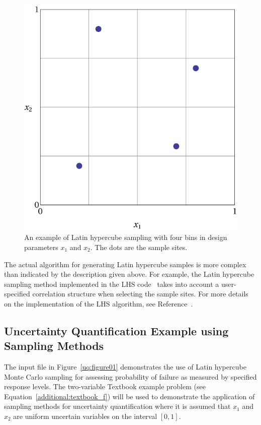 \begin{figure}[htbp!]
  \centering
  \includegraphics[scale=0.35]{images/lhs_graphic}
  \caption{An example of Latin hypercube sampling with four bins in
    design parameters $x_1$ and $x_2$. The dots
    are the sample sites.}
  \label{dace:figure01}
\end{figure}

The actual algorithm for generating Latin hypercube samples is more
complex than indicated by the description given above. For example,
the Latin hypercube sampling method implemented in the LHS
code~\cite{Swi04} takes into account a user-specified correlation
structure when selecting the sample sites. For more details on the
implementation of the LHS algorithm, see Reference~\cite{Swi04}.

\subsection{Uncertainty Quantification Example using Sampling Methods}\label{uq:uncertainty1}

The input file in Figure~\ref{uq:figure01} 
demonstrates the use of Latin hypercube Monte Carlo sampling for
assessing probability of failure as measured by specified response
levels.  The two-variable Textbook example problem (see
Equation~\ref{additional:textbook_f}) will be used to demonstrate
the application of sampling methods for uncertainty quantification
where it is assumed that $x_1$ and $x_2$ are uniform uncertain
variables on the interval $[0,1]$. 

